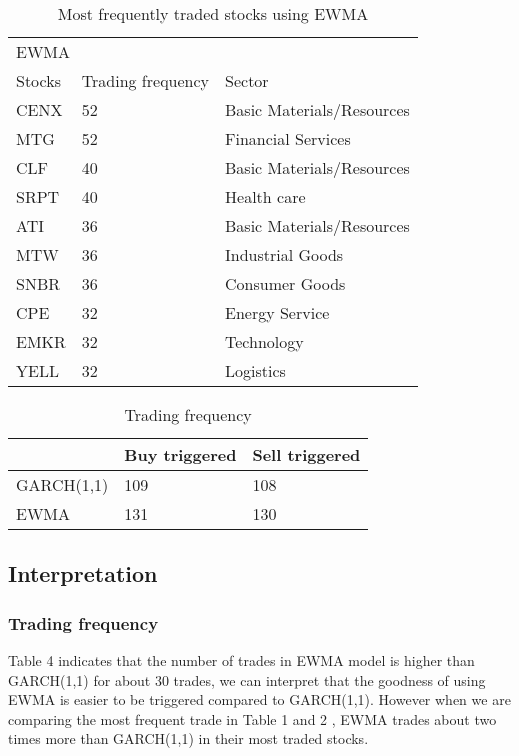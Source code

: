\documentclass[11pts]{article}
\begin{document}
\begin{table}[H]
\centering
\begin{tabular}{lll}
\hline
\multicolumn{3}{l}{EWMA}                               \\
Stocks & Trading frequency & Sector                    \\ \hline
CENX   & 52                & Basic Materials/Resources \\
MTG    & 52                & Financial Services        \\
CLF    & 40                & Basic Materials/Resources \\
SRPT   & 40                & Health care               \\
ATI    & 36                & Basic Materials/Resources \\
MTW    & 36                & Industrial Goods          \\
SNBR   & 36                & Consumer Goods            \\
CPE    & 32                & Energy Service            \\
EMKR   & 32                & Technology                \\
YELL   & 32                & Logistics                 \\ \hline
\end{tabular}
\caption{Most frequently traded stocks using EWMA
}
\label{tab:3}
\end{table}

\begin{table}[H]
\centering
\begin{tabular}{l|ll}
\hline
           & Buy triggered & Sell triggered \\ \hline
GARCH(1,1) & 109           & 108            \\
EWMA       & 131           & 130            \\ \hline
\end{tabular}
\caption{Trading frequency}
\label{tab:4}
\end{table}

\subsection{Interpretation}
\label{sec:orgc722d51}
\subsubsection{Trading frequency}
\label{sec:orgbf3db92}
Table 4 indicates that the number of trades in EWMA model is higher than GARCH(1,1) for about 30 trades, we can interpret that the goodness of using EWMA is easier to be triggered compared to GARCH(1,1). However when we are comparing the most frequent trade in Table 1 and 2 , EWMA trades about two times more than GARCH(1,1) in their most traded stocks.
\end{document}
